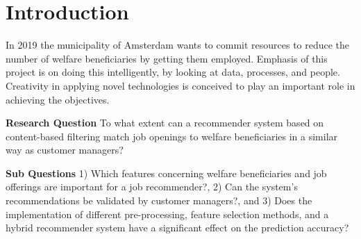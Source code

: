 \section{Introduction}
In 2019 the municipality of Amsterdam wants to commit resources to reduce the number of welfare beneficiaries by getting them employed. 
Emphasis of this project is on doing  this intelligently, by looking at data, processes, and people.
Creativity in applying novel technologies is conceived to play an important role in achieving the objectives.

\textbf{Research Question} To what extent can a recommender system based on content-based filtering match job openings to welfare beneficiaries in a similar way as customer managers?

\textbf{Sub Questions}
1) Which features concerning welfare beneficiaries and job offerings are important for a job recommender?, 2) Can the system’s recommendations be validated by customer managers?, and 3) Does the implementation of different pre-processing, feature selection methods, and a hybrid recommender system have a significant effect on the prediction accuracy?








